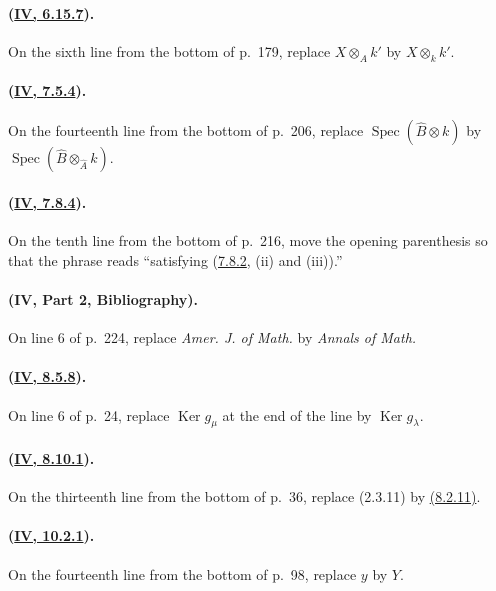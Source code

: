 \paragraph{({\texorpdfstring{\protect\hyperlink{ega4.c04.prop.6-15-7}{IV, 6.15.7}}{IV, 6.15.7}}).}
On the sixth line from the bottom of p.~179, replace
$X\otimes_Ak'$ by $X\otimes_kk'$.

\paragraph{({\texorpdfstring{\protect\hyperlink{ega4.c04.item.7-5-4}{IV, 7.5.4}}{IV, 7.5.4}}).}
On the fourteenth line from the bottom of p.~206, replace
$\operatorname{Spec}(\widehat B\otimes k)$ by
$\operatorname{Spec}(\widehat B\otimes_{\widehat A}k)$.

\paragraph{({\texorpdfstring{\protect\hyperlink{ega4.c04.item.7-8-4}{IV, 7.8.4}}{IV, 7.8.4}}).}
On the tenth line from the bottom of p.~216, move the opening parenthesis
so that the phrase reads ``satisfying ({\hyperlink{ega4.c04.def.7-8-2}{7.8.2}}, (ii) and (iii)).''

\paragraph{(IV, Part 2, Bibliography).}
On line 6 of p.~224, replace \emph{Amer. J. of Math.} by
\emph{Annals of Math.}

\paragraph{({\texorpdfstring{\protect\hyperlink{ega4.c04.cor.8-5-8}{IV, 8.5.8}}{IV, 8.5.8}}).}
On line 6 of p.~24, replace $\operatorname{Ker}g_\mu$ at the end of the
line by $\operatorname{Ker}g_\lambda$.

\paragraph{({\texorpdfstring{\protect\hyperlink{ega4.c04.prop.8-10-1}{IV, 8.10.1}}{IV, 8.10.1}}).}
On the thirteenth line from the bottom of p.~36, replace (2.3.11) by
{\hyperlink{ega4.c04.cor.8-2-11}{(8.2.11)}}.

\paragraph{({\texorpdfstring{\protect\hyperlink{ega4.c04.prop.10-2-1}{IV, 10.2.1}}{IV, 10.2.1}}).}
On the fourteenth line from the bottom of p.~98, replace $y$ by $Y$.

